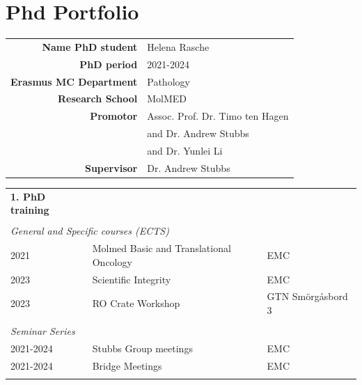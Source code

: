 \chapter{Phd Portfolio}
\label{AppendixE}

\begin{center}
\begin{table}[!ht]
    \begin{tabular}{rl}
        \textbf{Name PhD student}      & Helena Rasche \\
        \textbf{PhD period}            & 2021-2024 \\
        \textbf{Erasmus MC Department} & Pathology \\
        \textbf{Research School}       & MolMED \\
        \textbf{Promotor}              & Assoc. Prof. Dr. Timo ten Hagen\\
	     & and Dr. Andrew Stubbs \\
	     & and Dr. Yunlei Li\\
        \textbf{Supervisor}            & Dr. Andrew Stubbs \\
    \end{tabular}
\end{table}
\end{center}

\begin{table}[!ht]
    \begin{tabular}{lll}
        \textbf{1. PhD training} \\
        \\
        \multicolumn{3}{l}{\textit{General  and Specific courses (ECTS)}} \\
        2021 & Molmed Basic and Translational Oncology & EMC \\
        2023 & Scientific Integrity                    & EMC \\
        2023 & RO Crate Workshop                       & GTN Smörgåsbord 3 \\
        \\
        \textit{Seminar Series} \\
        2021-2024 & Stubbs Group meetings & EMC \\
        2021-2024 & Bridge Meetings       & EMC \\
        \\
    \end{tabular}
\end{table}

